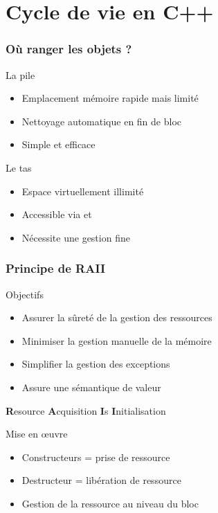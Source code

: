 \documentclass[svgnames]{beamer}
\begin{document}
\section{Cycle de vie en C++}
\frame
{
  \frametitle{Où ranger les objets ?}
  \begin{block}{La pile}
  \begin{itemize}
  \item Emplacement mémoire rapide mais limité
  \item Nettoyage automatique en fin de bloc
  \item Simple et efficace
  \end{itemize}
  \end{block}


  \begin{block}{Le tas}
  \begin{itemize}
  \item Espace virtuellement illimité
  \item Accessible via  et 
  \item Nécessite une gestion fine
  \end{itemize}
  \end{block}
}

\frame
{
  \frametitle{Principe de RAII}
  \begin{block}{Objectifs}
  \begin{itemize}\footnotesize
  \item Assurer la sûreté de la gestion des ressources
  \item Minimiser la gestion manuelle de la mémoire
  \item Simplifier la gestion des exceptions
  \item Assure une sémantique de valeur
  \end{itemize}
  \end{block}
  
  \begin{center}
  \textbf{R}esource \textbf{A}cquisition \textbf{I}s \textbf{I}nitialisation
  \end{center}

  \begin{block}{Mise en \oe{uvre}}
  \begin{itemize}\footnotesize
  \item Constructeurs = prise de ressource
  \item Destructeur = libération de ressource
  \item Gestion de la ressource au niveau du bloc
  \end{itemize}
  \end{block}
}
\end{document}
